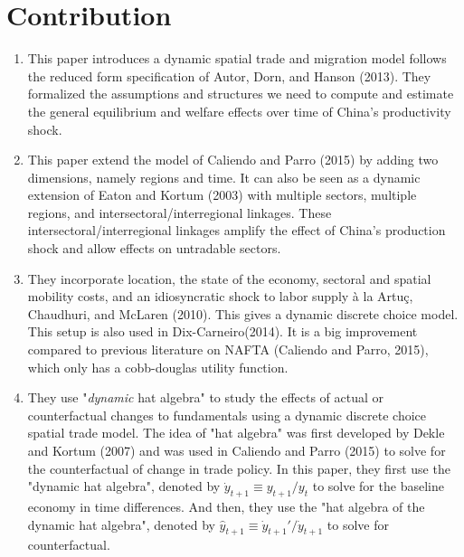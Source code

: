 \documentclass{article}
\begin{document}
\section{Contribution}
\begin{enumerate}
    \item This paper introduces a dynamic spatial trade and migration model follows the reduced form specification of Autor, Dorn, and Hanson (2013). They formalized the assumptions and structures we need to compute and estimate the general equilibrium and welfare effects over time of China's productivity shock.
    \item This paper extend the model of Caliendo and Parro (2015) by adding two dimensions, namely regions and time. It can also be seen as a dynamic extension of Eaton and Kortum (2003) with multiple sectors, multiple regions, and intersectoral/interregional linkages. These intersectoral/interregional linkages amplify the effect of China's production shock and allow effects on untradable sectors. 
    \item They incorporate location, the state of the economy, sectoral and spatial mobility costs, and an idiosyncratic shock to labor supply à la Artuç, Chaudhuri, and McLaren (2010). This gives a dynamic discrete choice model. This setup is also used in Dix-Carneiro(2014). It is a big improvement compared to previous literature on NAFTA (Caliendo and Parro, 2015), which only has a cobb-douglas utility function. 
    \item They use "\textit{dynamic} hat algebra" to study the effects of actual or counterfactual changes to fundamentals using a dynamic discrete choice spatial trade model. The idea of "hat algebra" was first developed by Dekle and Kortum (2007) and was used in Caliendo and Parro (2015) to solve for the counterfactual of change in trade policy. In this paper, they first use the "dynamic hat algebra", denoted by $\dot{y}_{t+1} \equiv y_{t+1}/y_{t}$ to solve for the baseline economy in time differences. And then, they use the "hat algebra of the dynamic hat algebra", denoted by $\hat{y}_{t+1} \equiv \dot{y}_{t+1}' / \dot{y}_{t+1}$ to solve for counterfactual. 
\end{enumerate}
\end{document}
